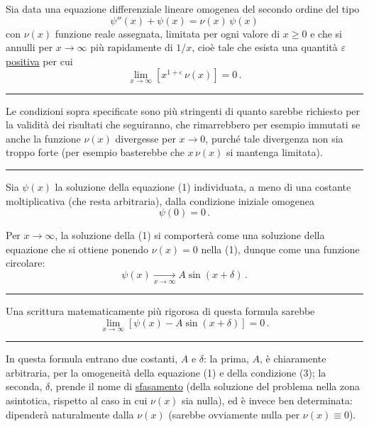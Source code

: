 \documentclass[11pt, a4paper]{book}
\numberwithin{equation}{section}
\begin{document}
Sia data una equazione differenziale lineare omogenea del secondo ordine del tipo
\begin{equation}
\psi''(x) + \psi(x) = \nu(x)\,\psi(x) \tag{1}
\end{equation}
con $\nu(x)$ funzione reale assegnata, limitata per ogni valore di $x \geq 0$ e che si annulli per $x \to \infty$ più rapidamente di $1/x$, cioè tale che esista una quantità $\varepsilon$ \uline{positiva} per cui
\begin{equation}
\lim_{x \to \infty} \left[x^{1+\varepsilon}\,\nu(x)\right] = 0\,. \tag{2}
\end{equation}

\noindent\rule{\linewidth}{0.4pt}

Le condizioni sopra specificate sono più stringenti di quanto sarebbe richiesto per la validità dei risultati che seguiranno, che rimarrebbero per esempio immutati se anche la funzione $\nu(x)$ divergesse per $x \to 0$, purché tale divergenza non sia troppo forte (per esempio basterebbe che $x\,\nu(x)$ si mantenga limitata).

\noindent\rule{\linewidth}{0.4pt}

Sia $\psi(x)$ la soluzione della equazione (1) individuata, a meno di una costante moltiplicativa (che resta arbitraria), dalla condizione iniziale omogenea
\begin{equation}
\psi(0) = 0\,. \tag{3}
\end{equation}

Per $x \to \infty$, la soluzione della (1) si comporterà come una soluzione della equazione che si ottiene ponendo $\nu(x) = 0$ nella (1), dunque come una funzione circolare:
\begin{equation}
\psi(x) \xrightarrow[x \to \infty]{} A\sin(x + \delta)\,. \tag{4}
\end{equation}

\noindent\rule{\linewidth}{0.4pt}

Una scrittura matematicamente più rigorosa di questa formula sarebbe
\[
\lim_{x \to \infty}\left[\psi(x) - A\sin(x+\delta)\right] = 0\,.
\]

\noindent\rule{\linewidth}{0.4pt}


In questa formula entrano due costanti, $A$ e $\delta$: la prima, $A$, è chiaramente arbitraria, per la omogeneità della equazione (1) e della condizione (3); la seconda, $\delta$, prende il nome di \uline{sfasamento} (della soluzione del problema nella zona asintotica, rispetto al caso in cui $\nu(x)$ sia nulla), ed è invece ben determinata: dipenderà naturalmente dalla $\nu(x)$ (sarebbe ovviamente nulla per $\nu(x) \equiv 0$).
\end{document}

